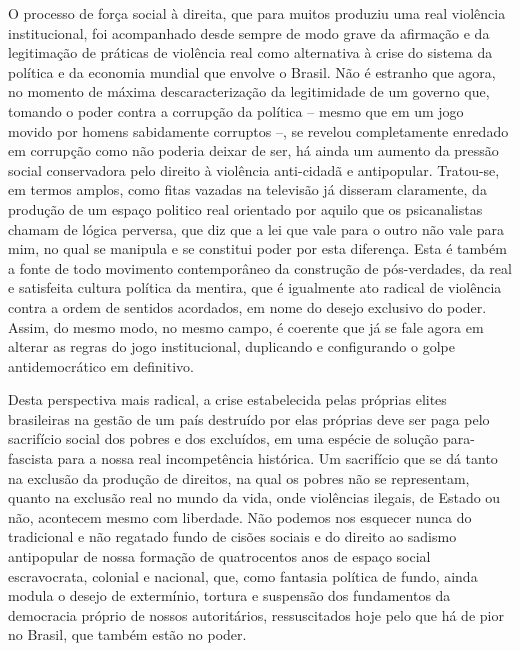 O processo de força social à direita, que para muitos produziu uma real
violência institucional, foi acompanhado desde sempre de modo grave da
afirmação e da legitimação de práticas de violência real como
alternativa à crise do sistema da política e da economia mundial que
envolve o Brasil. Não é estranho que agora, no momento de máxima
descaracterização da legitimidade de um governo que, tomando o poder
contra a corrupção da política -- mesmo que em um jogo movido por homens
sabidamente corruptos --, se revelou completamente enredado em corrupção
como não poderia deixar de ser, há ainda um aumento da pressão social
conservadora pelo direito à violência anti-cidadã e antipopular.
Tratou-se, em termos amplos, como fitas vazadas na televisão já disseram
claramente, da produção de um espaço politico real orientado por aquilo
que os psicanalistas chamam de lógica perversa, que diz que a lei que
vale para o outro não vale para mim, no qual se manipula e se constitui
poder por esta diferença. Esta é também a fonte de todo movimento
contemporâneo da construção de pós-verdades, da real e satisfeita
cultura política da mentira, que é igualmente ato radical de violência
contra a ordem de sentidos acordados, em nome do desejo exclusivo do
poder. Assim, do mesmo modo, no mesmo campo, é coerente que já se fale
agora em alterar as regras do jogo institucional, duplicando e
configurando o golpe antidemocrático em definitivo.

Desta perspectiva mais radical, a crise estabelecida pelas próprias
elites brasileiras na gestão de um país destruído por elas próprias deve
ser paga pelo sacrifício social dos pobres e dos excluídos, em uma
espécie de solução para-fascista para a nossa real incompetência
histórica. Um sacrifício que se dá tanto na exclusão da produção de
direitos, na qual os pobres não se representam, quanto na exclusão real
no mundo da vida, onde violências ilegais, de Estado ou não, acontecem
mesmo com liberdade. Não podemos nos esquecer nunca do tradicional e não
regatado fundo de cisões sociais e do direito ao sadismo antipopular de
nossa formação de quatrocentos anos de espaço social escravocrata,
colonial e nacional, que, como fantasia política de fundo, ainda modula
o desejo de extermínio, tortura e suspensão dos fundamentos da
democracia próprio de nossos autoritários, ressuscitados hoje pelo que
há de pior no Brasil, que também estão no poder.

